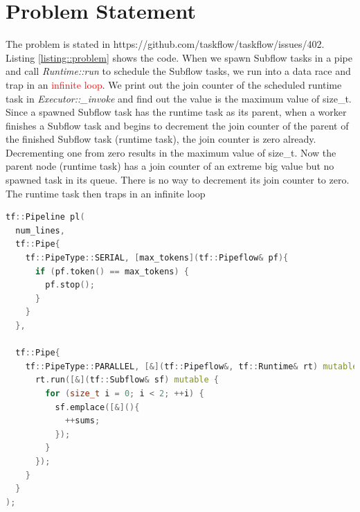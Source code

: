\documentclass[11pt,twoside]{article}
\theoremstyle{plain}
\theoremstyle{definition}
\theoremstyle{remark}
\begin{document}
%




%
%
%


%
%

%

\section{Problem Statement}

The problem is stated in https://github.com/taskflow/taskflow/issues/402.
Listing \ref{listing::problem} shows the code.
When we spawn Subflow tasks in a pipe and call \textit{Runtime::run}
to schedule the Subflow tasks,
we run into a data race and trap in an \textcolor{red}{infinite loop}.
We print out the join counter of the scheduled runtime task in
\textit{Executor::\_invoke} and find out the value is the maximum value of size\_t.
Since a spawned Subflow task has the runtime task as its parent,
when a worker finishes a Subflow task and begins to decrement the join counter
of the parent of the finished Subflow task (runtime task),
the join counter is zero already.
Decrementing one from zero results in the maximum value of size\_t.
Now the parent node (runtime task) has a join counter of an extreme big value
but no spawned task in its queue.
There is no way to decrement its join counter to zero.
The runtime task then traps in an infinite loop 
 
\begin{lstlisting}[language=C++,label=listing::problem,caption={Code of the problem.}]
tf::Pipeline pl(
  num_lines, 
  tf::Pipe{
    tf::PipeType::SERIAL, [max_tokens](tf::Pipeflow& pf){
      if (pf.token() == max_tokens) {
        pf.stop();
      }
    }
  },

  tf::Pipe{
    tf::PipeType::PARALLEL, [&](tf::Pipeflow&, tf::Runtime& rt) mutable {
      rt.run([&](tf::Subflow& sf) mutable {
        for (size_t i = 0; i < 2; ++i) {
          sf.emplace([&](){
            ++sums;  
          });
        }
      });
    }
  }
);

\end{lstlisting}
\end{document}

